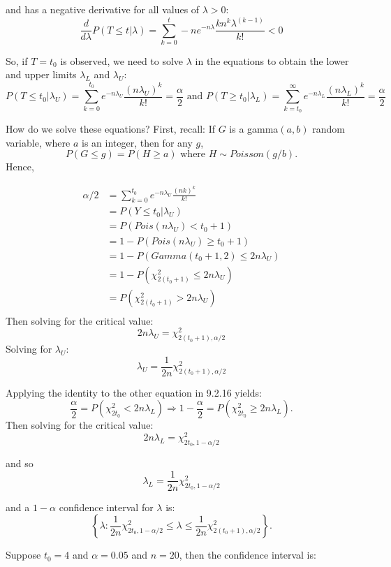 \documentclass[11pt,]{article}
\begin{document}
and has a negative derivative for all values of \(\lambda>0\):
\[\frac{d}{d\lambda} P(T\leq t | \lambda) = \sum_{k=0}^{t} -ne^{-n\lambda}\frac{kn^k\lambda^{(k-1)}}{k!}<0\]

So, if \(T = t_0\) is observed, we need to solve \(\lambda\) in the
equations to obtain the lower and upper limits \(\lambda_L\) and
\(\lambda_U\): \begin{equation*}
P(T\leq t_0 | \lambda_U)= \sum_{k=0}^{t_0} e^{-n\lambda_U}\frac{(n\lambda_U)^k}{k!} = \frac{\alpha}{2} \mbox{ and } 
P(T\geq t_0 | \lambda_L) = \sum_{k=t_0}^{\infty} e^{-n\lambda_L}\frac{(n\lambda_L)^k}{k!} = \frac{\alpha}{2} 
\tag{9.2.16}
\end{equation*}

How do we solve these equations? First, recall: If \(G\) is a
gamma\((a,b)\) random variable, where \(a\) is an integer, then for any
\(g\), \[P(G \leq g) = P(H\geq a) \mbox{ where } H\sim Poisson(g/b).\]
Hence,

\begin{align*}
\alpha/2 & =  \sum_{k=0}^{t_0} e^{-n\lambda_U}\frac{(nk)^k}{k!} \\
& =P(Y \leq t_0 | \lambda_U) \\
&= P(Pois(n\lambda_U) < t_0 + 1)\\
&= 1 - P(Pois(n\lambda_U) \geq t_0 + 1)\\
&= 1 - P(Gamma(t_0 + 1, 2) \leq 2n\lambda_U)\\
& = 1 - P(\chi^2_{2(t_0+1)}\leq 2n\lambda_U)\\
& = P(\chi^2_{2(t_0+1)}> 2n\lambda_U)\\
\end{align*} Then solving for the critical value:
\[2n\lambda_U = \chi^2_{2(t_0+1),\alpha/2}\] Solving for \(\lambda_U\):
\[\lambda_U = \frac{1}{2n}\chi^2_{2(t_0 + 1),\alpha/2}\]

Applying the identity to the other equation in 9.2.16 yields:
\[\frac{\alpha}{2} = P(\chi^2_{2t_0} < 2n\lambda_L) \Rightarrow 1-\frac{\alpha}{2} = P(\chi^2_{2t_0} \geq 2n\lambda_L).\]
Then solving for the critical value:
\[2n\lambda_L = \chi^2_{2t_0,1-\alpha/2}\]

and so \[\lambda_L = \frac{1}{2n}\chi^2_{2t_0, 1-\alpha/2}\]

and a \(1-\alpha\) confidence interval for \(\lambda\) is:
\[\left\{ \lambda: \frac{1}{2n} \chi^2_{2t_0,1-\alpha/2} \leq \lambda \leq \frac{1}{2n}\chi^2_{2(t_0 + 1),\alpha/2}\right\}.\]

Suppose \(t_0 = 4\) and \(\alpha = 0.05\) and \(n=20\), then the
confidence interval is:
\end{document}
